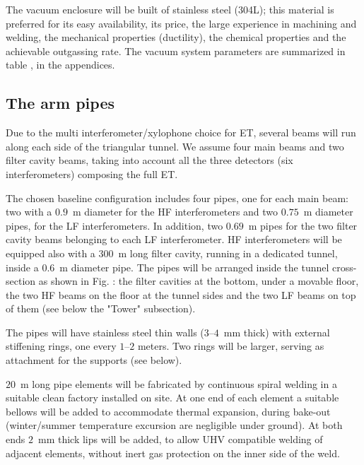 The vacuum enclosure will be built of stainless steel (304L); this material is preferred for its easy availability, its price, the large experience in machining and welding, the mechanical properties (ductility), the chemical properties and the achievable outgassing rate. The vacuum system parameters are summarized in table 
, in the appendices. 

\subsection{The arm pipes} 
Due to the multi interferometer/xylophone choice for ET, several beams will run along each side of the triangular tunnel. We assume four main beams and two filter cavity beams, taking into account all the three detectors (six interferometers) composing the full ET. 

The chosen baseline configuration includes four pipes, one for each main beam: two with a $0.9$~m diameter for the HF interferometers and two $0.75$~m diameter pipes, for the LF interferometers. In addition, two $0.69$~m pipes for the two filter cavity beams belonging to each LF interferometer. HF interferometers will be equipped also with a $300$~m long filter cavity, running in a dedicated tunnel, inside a $0.6$~m diameter pipe. The pipes will be arranged inside the tunnel cross-section as shown in Fig. 
: the filter cavities at the bottom, under a movable floor, the two HF beams on the floor at the tunnel sides and the two LF beams on top of them (see below the "Tower" subsection).

The pipes will have stainless steel thin walls ($3$--$4$~mm thick) with external stiffening rings, one every $1$--$2$ meters. Two rings will be larger, serving as attachment for the supports (see below). 

$20$~m long pipe elements will be fabricated by continuous spiral welding in a suitable clean factory installed on site. At one end of each element a suitable bellows will be added to accommodate thermal expansion, during bake-out (winter/summer temperature excursion are negligible under ground). At both ends $2$~mm thick lips will be added, to allow UHV compatible welding of adjacent elements, without inert gas protection on the inner side of the weld. 

